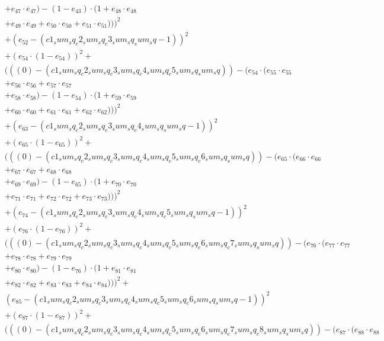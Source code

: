 \documentclass[10pt, a4paper]{article}
\begin{document}
\begin{small}
\begin{align*}
& + e_{47} \cdot e_{47}) - (1 - e_{43}) \cdot (1 + e_{48} \cdot e_{48} \\
& + e_{49} \cdot e_{49} + e_{50} \cdot e_{50} + e_{51} \cdot e_{51})))^{2} \\
& + (e_{52} - (c1_sum_sq_c2_sum_sq_c3_sum_sq_sum_sq - 1))^{2} \\
& + (e_{54} \cdot (1 - e_{54}))^{2} + \\
& (((0) - (c1_sum_sq_c2_sum_sq_c3_sum_sq_c4_sum_sq_c5_sum_sq_sum_sq)) - (e_{54} \cdot (e_{55} \cdot e_{55} \\
& + e_{56} \cdot e_{56} + e_{57} \cdot e_{57} \\
& + e_{58} \cdot e_{58}) - (1 - e_{54}) \cdot (1 + e_{59} \cdot e_{59} \\
& + e_{60} \cdot e_{60} + e_{61} \cdot e_{61} + e_{62} \cdot e_{62})))^{2} \\
& + (e_{63} - (c1_sum_sq_c2_sum_sq_c3_sum_sq_c4_sum_sq_sum_sq - 1))^{2} \\
& + (e_{65} \cdot (1 - e_{65}))^{2} + \\
& (((0) - (c1_sum_sq_c2_sum_sq_c3_sum_sq_c4_sum_sq_c5_sum_sq_c6_sum_sq_sum_sq)) - (e_{65} \cdot (e_{66} \cdot e_{66} \\
& + e_{67} \cdot e_{67} + e_{68} \cdot e_{68} \\
& + e_{69} \cdot e_{69}) - (1 - e_{65}) \cdot (1 + e_{70} \cdot e_{70} \\
& + e_{71} \cdot e_{71} + e_{72} \cdot e_{72} + e_{73} \cdot e_{73})))^{2} \\
& + (e_{74} - (c1_sum_sq_c2_sum_sq_c3_sum_sq_c4_sum_sq_c5_sum_sq_sum_sq - 1))^{2} \\
& + (e_{76} \cdot (1 - e_{76}))^{2} + \\
& (((0) - (c1_sum_sq_c2_sum_sq_c3_sum_sq_c4_sum_sq_c5_sum_sq_c6_sum_sq_c7_sum_sq_sum_sq)) - (e_{76} \cdot (e_{77} \cdot e_{77} \\
& + e_{78} \cdot e_{78} + e_{79} \cdot e_{79} \\
& + e_{80} \cdot e_{80}) - (1 - e_{76}) \cdot (1 + e_{81} \cdot e_{81} \\
& + e_{82} \cdot e_{82} + e_{83} \cdot e_{83} + e_{84} \cdot e_{84})))^{2} + \\
& (e_{85} - (c1_sum_sq_c2_sum_sq_c3_sum_sq_c4_sum_sq_c5_sum_sq_c6_sum_sq_sum_sq - 1))^{2} \\
& + (e_{87} \cdot (1 - e_{87}))^{2} + \\
& (((0) - (c1_sum_sq_c2_sum_sq_c3_sum_sq_c4_sum_sq_c5_sum_sq_c6_sum_sq_c7_sum_sq_c8_sum_sq_sum_sq)) - (e_{87} \cdot (e_{88} \cdot e_{88} \\

\end{align*}
\end{small}
\end{document}
